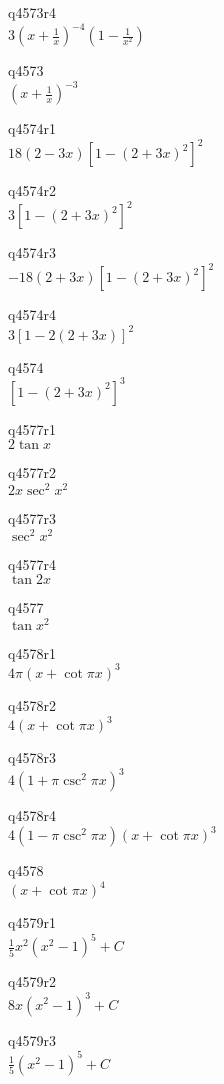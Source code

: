 q4573r4\\
\(\displaystyle 3 \left ( x + \frac{1}{x} \right )^{-4} \left ( 1 - \frac{1}{x^2} \right ) \)

q4573\\
\(\displaystyle \left ( x + \frac{1}{x} \right ) ^{-3} \)

q4574r1\\
\(\displaystyle 18(2 - 3x) [1 - (2 + 3x)^2]^2 \)

q4574r2\\
\(\displaystyle 3[1 - (2 + 3x)^2]^2 \)

q4574r3\\
\(\displaystyle -18(2 + 3x)[1 - (2+3x)^2]^2 \)

q4574r4\\
\(\displaystyle 3[1 - 2(2 + 3x)]^2 \)

q4574\\
\(\displaystyle [1 - (2 + 3x)^2]^3 \)

q4577r1\\
\(\displaystyle 2 \tan x \)

q4577r2\\
\(\displaystyle 2x \sec^2 x^2 \)

q4577r3\\
\(\displaystyle \sec^2 x^2 \)

q4577r4\\
\(\displaystyle \tan 2x \)

q4577\\
\(\displaystyle \tan x^2 \)

q4578r1\\
\(\displaystyle 4\pi (x + \cot \pi x)^3 \)

q4578r2\\
\(\displaystyle 4 (x + \cot \pi x)^3 \)

q4578r3\\
\(\displaystyle 4(1 + \pi \csc^2 \pi x)^3 \)

q4578r4\\
\(\displaystyle 4(1 - \pi \csc^2 \pi x)(x + \cot \pi x)^3 \)

q4578\\
\(\displaystyle (x + \cot \pi x)^4 \)

q4579r1\\
\(\displaystyle \frac{1}{5} x^2(x^2 - 1)^5 + C \)

q4579r2\\
\(\displaystyle 8x (x^2 - 1)^3 + C \)

q4579r3\\
\(\displaystyle \frac{1}{5} (x^2 - 1)^5 + C \)

